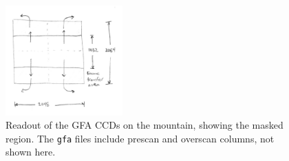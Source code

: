 \documentclass[10pt]{article}
\newcommand{\code}[1]{\texttt{#1}}
\begin{document}
\begin{figure}[h!]
  \begin{center}
    \includegraphics[width=0.4\textwidth]{gfa-metrology2.jpeg}
  \end{center}
  \caption{\label{fig:mountain}Readout of the GFA CCDs on the
    mountain, showing the masked region.  The \code{gfa} files include
    prescan and overscan columns, not shown here.}
\end{figure}
\end{document}
